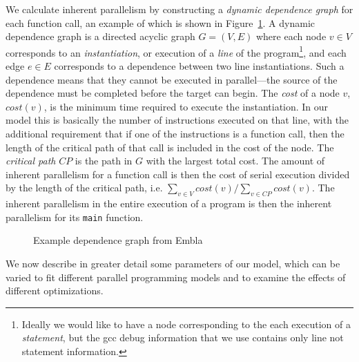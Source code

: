 We calculate inherent parallelism by constructing a \emph{dynamic dependence graph} for each function call, an example of which is shown in Figure~\ref{example-depgraph}.
A dynamic dependence graph is a directed acyclic graph $G=(V,E)$ where each node $v\in V$ corresponds to an \emph{instantiation}, or execution of a \emph{line} of the program\footnote{Ideally we would like to have a node corresponding to the each execution of a \emph{statement}, but the gcc debug information that we use contains only line not statement information.}, and each edge $e\in E$ corresponds to a dependence between two line instantiations.
Such a dependence means that they cannot be executed in parallel---the source of the dependence must be completed before the target can begin.
The \emph{cost} of a node $v$, $\mathit{cost}(v)$, is the minimum time required to execute the instantiation.
In our model this is basically the number of instructions executed on that line, with the additional requirement that if one of the instructions is a function call, then the length of the critical path of that call is included in the cost of the node.
The \emph{critical path} $\mathit{CP}$ is the path in $G$ with the largest total cost.
The amount of inherent parallelism for a function call is then the cost of serial execution divided by the length of the critical path, i.e. $\sum_{v\in V} \mathit{cost}(v)/\sum_{v\in \mathit{CP}} \mathit{cost}(v)$.
The inherent parallelism in the entire execution of a program is then the inherent parallelism for its \texttt{main} function.

\begin{figure}
  \begin{center}
  \small
  
  \end{center}
  \nocaptionrule \caption{Example dependence graph from Embla}
  \label{example-depgraph}
\end{figure}

We now describe in greater detail some parameters of our model, which can be varied to fit different parallel programming models and to examine the effects of different optimizations.


